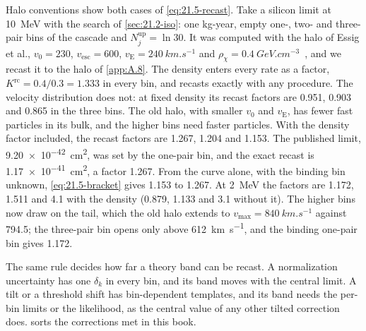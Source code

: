 Halo conventions show both cases of \cref{eq:21.5-recast}. Take a silicon limit at \SI{10}{MeV} with the search of \cref{sec:21.2-iso}: one kg-year, empty one-, two- and three-pair bins of the cascade and $N_j^{\mathrm{up}} = \ln 30$. It was computed with the halo of Essig et al., $v_0 = 230$, $v_{\mathrm{esc}} = 600$, $v_{\mathrm{E}} = \SI{240}{km.s^{-1}}$ and $\rho_\chi = \SI{0.4}{GeV.cm^{-3}}$~\cite[App.~B]{essig2016direct}, and we recast it to the halo of \cref{app:A.8}. The density enters every rate as a factor, $K^{\mathrm{rc}} = 0.4/0.3 = 1.333$ in every bin, and recasts exactly with any procedure. The velocity distribution does not: at fixed density its recast factors are 0.951, 0.903 and 0.865 in the three bins. The old halo, with smaller $v_0$ and $v_{\mathrm{E}}$, has fewer fast particles in its bulk, and the higher bins need faster particles. With the density factor included, the recast factors are 1.267, 1.204 and 1.153. The published limit, \SI{9.20e-42}{cm^2}, was set by the one-pair bin, and the exact recast is \SI{1.17e-41}{cm^2}, a factor 1.267. From the curve alone, with the binding bin unknown, \cref{eq:21.5-bracket} gives 1.153 to 1.267. At \SI{2}{MeV} the factors are 1.172, 1.511 and 4.1 with the density (0.879, 1.133 and 3.1 without it). The higher bins now draw on the tail, which the old halo extends to $v_{\mathrm{max}} = \SI{840}{km.s^{-1}}$ against 794.5; the three-pair bin opens only above \SI{612}{km.s^{-1}}, and the binding one-pair bin gives 1.172.

The same rule decides how far a theory band can be recast. A normalization uncertainty has one $\delta_k$ in every bin, and its band moves with the central limit. A tilt or a threshold shift has bin-dependent templates, and its band needs the per-bin limits or the likelihood, as the central value of any other tilted correction does.  sorts the corrections met in this book.

